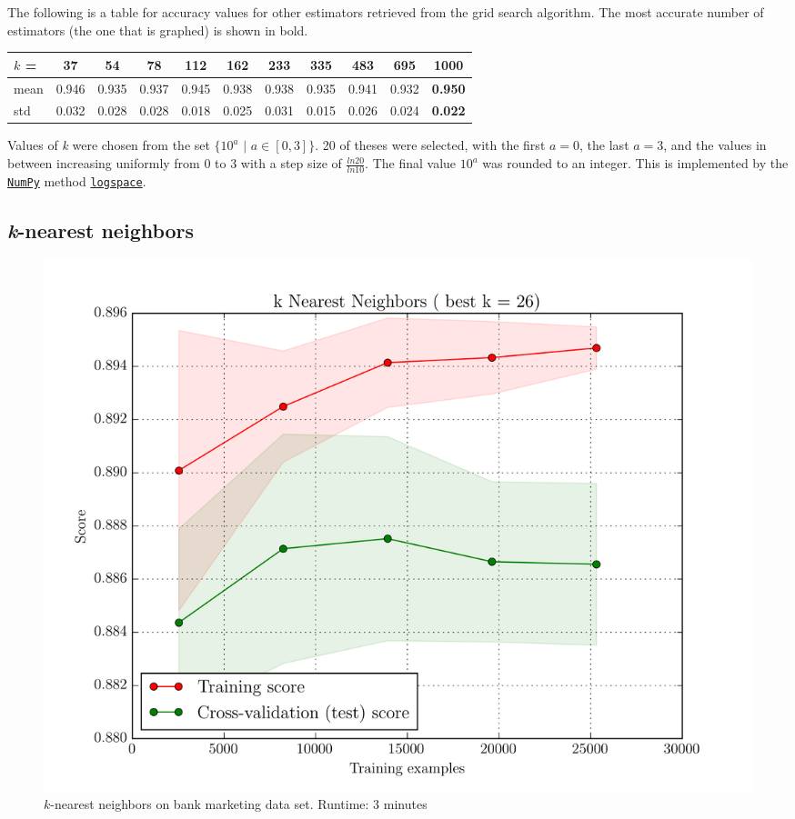 The following is a table for accuracy values for other estimators retrieved from the grid search algorithm.
The most accurate number of estimators (the one that is graphed) is shown in bold.
\begin{center}
    \begin{tabular}{l|| c | c | c | c | c | c | c | c | c | c}
        $k$ = & 37    & 54    & 78    & 112   & 162   & 233   & 335   & 483   & 695   & \textbf{1000}\\
         \hline
         mean & 0.946 & 0.935 & 0.937 & 0.945 & 0.938 & 0.938 & 0.935 & 0.941 & 0.932 & \textbf{0.950}\\
         std  & 0.032 & 0.028 & 0.028 & 0.018 & 0.025 & 0.031 & 0.015 & 0.026 & 0.024 & \textbf{0.022}
    \end{tabular}
\end{center}

Values of \textit{k} were chosen from the set $\{10^{a}$ $|$ $a \in [0, 3]\}$. 20 of theses were selected, with the first $a=0$, the last $a=3$, and the values in between increasing uniformly from 0 to 3 with a step size of $\frac{ln20}{ln10}$. The final value $10^{a}$ was rounded to an integer. This is implemented by the \href{http://docs.scipy.org/doc/numpy-1.10.0/index.html}{\texttt{NumPy}} method \href{http://docs.scipy.org/doc/numpy-1.10.0/reference/generated/numpy.logspace.html}{\texttt{logspace}}.

\subsection{\textit{k}-nearest neighbors}
\begin{figure}[H]
    \centering
    \includegraphics[width=.7\textwidth]{bank/knn.png}
    \caption{$k$-nearest neighbors on bank marketing data set. Runtime: 3 minutes}
\end{figure}

